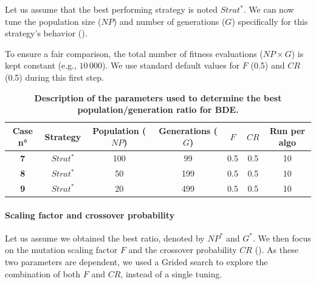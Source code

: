 \documentclass[12pt, openany]{article}
\begin{document}
Let us assume that the best performing strategy is noted $Strat^*$. We can now tune the population size ($NP$) and number of generations ($G$) specifically for this strategy's behavior ().

To ensure a fair comparison, the total number of fitness evaluations ($NP \times G$) is kept constant (e.g., $10\,000$). We use standard default values for $F$ (0.5) and $CR$ (0.5) during this first step.

\begin{table}[H]
    \centering
    \renewcommand{\arraystretch}{1.5}
    \begin{tabular}{|c|c|c|c|c|c|c|}
        \hline 
        \textbf{Case n°} & \textbf{Strategy} & \textbf{Population ($NP$)} & \textbf{Generations ($G$)} & $F$ & $CR$ & \textbf{Run per algo} \\ \hline

        \textbf{7} & $Strat^*$ & 100 & 99 & 0.5 & 0.5 & 10 \\ \hdashline
        \textbf{8} & $Strat^*$ & 50 & 199 & 0.5 & 0.5 & 10 \\ \hdashline
        \textbf{9} & $Strat^*$ &20 & 499 & 0.5 & 0.5 & 10 \\ 
        \hline
    \end{tabular}
    \caption{\textbf{Description of the parameters used to determine the best population/generation ratio for BDE.}}
    \label{tab:Cases_Determine_BDE_Pop_Gen}
\end{table}

\paragraph{Scaling factor and crossover probability}

Let us assume we obtained the best ratio, denoted by $NP^*$ and $G^*$. We then focus on the mutation scaling factor $F$ and the crossover probability $CR$ (). As these two parameters are dependent, we used a Grided search to explore the combination of both $F$ and $CR$, instead of a single tuning.
\end{document}
